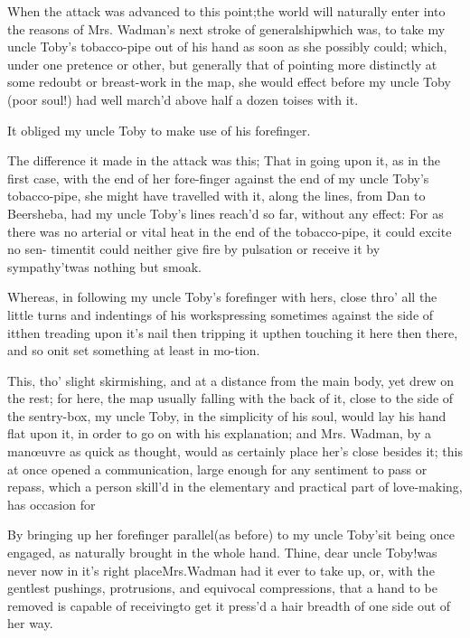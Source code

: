 \documentclass{article}
\begin{document}
When the attack was advanced to this point;\tsh the
world will naturally enter into the reasons of Mrs.
Wadman’s next stroke of generalship\tsh which
was, to take my uncle Toby’s tobacco-pipe out of his
hand as soon as she possibly could; which, under one pretence or
other, but generally that of pointing more distinctly at some
redoubt or breast-work in the map, she would effect before my uncle
Toby (poor soul!) had well march’d above half a dozen
toises with it.

\tsk  It obliged my uncle Toby to make use of his
forefinger.

The difference it made in the attack was this; That in going upon it, as in the
first case, with the end of her fore-finger against the end of my uncle Toby’s
tobacco-pipe, she might have travelled with it, along the lines, from Dan to
Beersheba, had my uncle Toby’s lines reach’d so far, without any effect: For as
there was no arterial or vital heat in the end of the tobacco-pipe, it could excite
no sen- timent\tsh it could neither give fire by pulsation \tsh or receive it by
sympathy\break\null\tsh ’twas nothing but smoak.

Whereas, in following my uncle Toby’s forefinger
with hers, close thro’ all the little turns and indentings of
his works\tsh pressing sometimes against the side of
it\tsh then treading upon it's nail \tsh then
tripping it up\tsh then touching it here \tsh then
there, and so on\tsh it set something at least in
mo-\break tion.

This, tho’ slight skirmishing, and at a distance from the
main body, yet drew on the rest; for here, the map usually falling
with the back of it, close to the side of the sentry-box, my uncle
Toby, in the simplicity of his soul, would lay his hand flat
upon it, in order to go on with his explanation; and Mrs.\@
Wadman, by a manœuvre as quick as thought, would as
certainly place her’s close besides it; this at once opened a
communication, large enough for any sentiment to pass or repass,
which a person skill’d in the elementary and practical part of love-making, has
occasion for\tsh

By bringing up her forefinger parallel\break (as before) to my uncle Toby’s\tsk it
being once engaged, as naturally brought in the whole hand. Thine, dear uncle
Toby!\@ was never now in it’s right place\break\tsh Mrs.\@ Wadman had it ever to
take up, or, with the gentlest pushings, protrusions, and equivocal compressions,
that a hand to be removed is capable of receiving\tsh to get it press’d a hair
breadth of one side out of her way.
\end{document}
